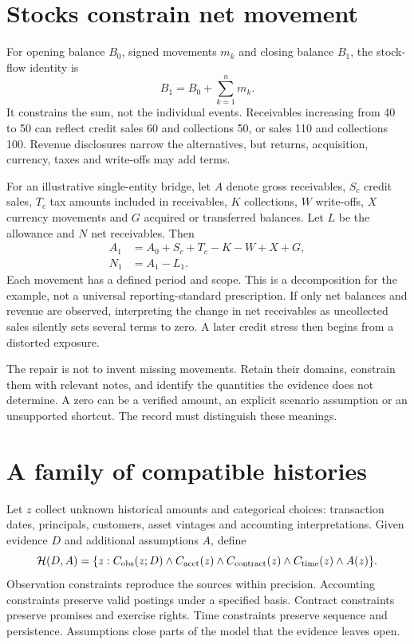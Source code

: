 \section{Stocks constrain net movement}
For opening balance $B_0$, signed movements $m_k$ and closing balance $B_1$, the stock-flow identity is
\begin{equation}
 B_1=B_0+\sum_{k=1}^{n}m_k.
 \label{sim:stockflow}
\end{equation}
It constrains the sum, not the individual events. Receivables increasing from 40 to 50 can reflect credit sales 60 and collections 50, or sales 110 and collections 100. Revenue disclosures narrow the alternatives, but returns, acquisition, currency, taxes and write-offs may add terms.

For an illustrative single-entity bridge, let $A$ denote gross receivables, $S_c$ credit sales, $T_c$ tax amounts included in receivables, $K$ collections, $W$ write-offs, $X$ currency movements and $G$ acquired or transferred balances. Let $L$ be the allowance and $N$ net receivables. Then
\begin{align}
 A_1&=A_0+S_c+T_c-K-W+X+G,\\
 N_1&=A_1-L_1.
 \label{sim:receivable-bridge}
\end{align}
Each movement has a defined period and scope. This is a decomposition for the example, not a universal reporting-standard prescription. If only net balances and revenue are observed, interpreting the change in net receivables as uncollected sales silently sets several terms to zero. A later credit stress then begins from a distorted exposure.

The repair is not to invent missing movements. Retain their domains, constrain them with relevant notes, and identify the quantities the evidence does not determine. A zero can be a verified amount, an explicit scenario assumption or an unsupported shortcut. The record must distinguish these meanings.

\section{A family of compatible histories}
Let $z$ collect unknown historical amounts and categorical choices: transaction dates, principals, customers, asset vintages and accounting interpretations. Given evidence $D$ and additional assumptions $A$, define
\begin{equation}
 \mathcal H(D,A)=\{z:C_{\rm obs}(z;D)\land C_{\rm acct}(z)\land
 C_{\rm contract}(z)\land C_{\rm time}(z)\land A(z)\}.
 \label{sim:family}
\end{equation}
Observation constraints reproduce the sources within precision. Accounting constraints preserve valid postings under a specified basis. Contract constraints preserve promises and exercise rights. Time constraints preserve sequence and persistence. Assumptions close parts of the model that the evidence leaves open.

